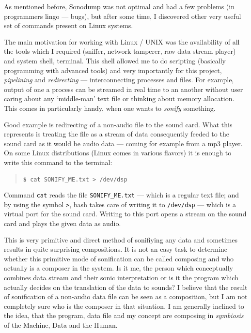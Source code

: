\documentclass[12pt,a4paper,oneside]{report}
\begin{document}
As mentioned before, Sonodump was not optimal and had a few problems (in programmers lingo --- bugs), but after some time, I discovered other very useful set of commands present on Linux systems.

The main motivation for working with Linux / UNIX was the availability of all the tools which I required (sniffer, network tamperer, raw data stream player) and system shell, terminal. This shell allowed me to do scripting (basically programming with advanced tools) and very importantly for this project, \emph{pipelining} and \emph{redirecting} --- interconnecting processes and files. For example, output of one a process can be streamed in real time to an another without user caring about any `middle-man' text file or thinking about memory allocation. This comes in particularly handy, when one wants to \emph{sonify} something. 

Good example is redirecting of a non-audio file to the sound card. What this represents is treating the file as a stream of data consequently feeded to the sound card as it would be audio data --- coming for example from a mp3 player. On some Linux distributions (Linux comes in various flavors) it is enough to write this command to the terminal:
\begin{quotation}
	\texttt{\textbf{\$} cat SONIFY\_ME.txt > /dev/dsp} 
\end{quotation}

Command \texttt{cat} reads the file \texttt{SONIFY\_ME.txt} --- which is a regular text file; and by using the symbol \texttt{>}, bash takes care of writing it to \texttt{/dev/dsp} --- which is a virtual port for the sound card. Writing to this port opens a stream on the sound card and plays the given data as audio.

This is very primitive and direct method of sonifiying any data and sometimes results in quite surprising compositions. It is not an easy task to determine whether this primitive mode of sonification can be called composing and who actually is a composer in the system. Is it me, the person which conceptually combines data stream and their sonic interpretation or is it the program which actually decides on the translation of the data to sounds? I believe that the result of sonification of a non-audio data file can be seen as a composition, but I am not completely sure who is the composer in that situation. I am generally inclined to the idea, that the program, data file and my concept are composing in \emph{symbiosis} of the Machine, Data and the Human.
\end{document}
